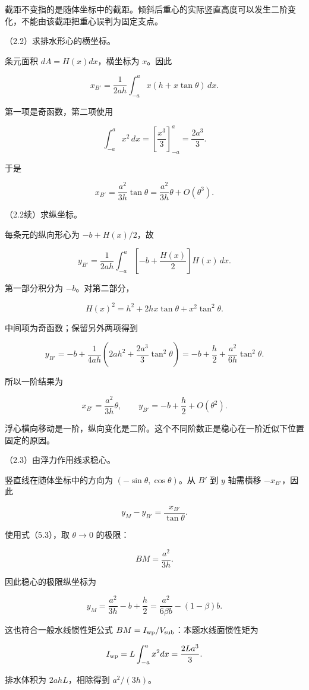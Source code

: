 \documentclass[12pt,a4paper,fontset=fandol]{ctexart}
\begin{document}
截距不变指的是随体坐标中的截距。倾斜后重心的实际竖直高度可以发生二阶变化，不能由该截距把重心误判为固定支点。

（2.2）求排水形心的横坐标。

条元面积 \(dA=H(x)dx\)，横坐标为 \(x\)。因此

\[
x_{B'}=\frac{1}{2ah}\int_{-a}^a x(h+x\tan\theta)\,dx.
\]

第一项是奇函数，第二项使用

\[
\int_{-a}^a x^2\,dx=\left[\frac{x^3}{3}\right]_{-a}^a=\frac{2a^3}{3}.
\]

于是

\[
x_{B'}=\frac{a^2}{3h}\tan\theta
=\frac{a^2}{3h}\theta+O(\theta^3).
\tag{5.3}
\]

（2.2续）求纵坐标。

每条元的纵向形心为 \(-b+H(x)/2\)，故

\[
y_{B'}=\frac{1}{2ah}\int_{-a}^a
\left[-b+\frac{H(x)}2\right]H(x)\,dx.
\]

第一部分积分为 \(-b\)。对第二部分，

\[
H(x)^2=h^2+2hx\tan\theta+x^2\tan^2\theta.
\]

中间项为奇函数；保留另外两项得到

\[
y_{B'}=-b+\frac{1}{4ah}
\left(2ah^2+\frac{2a^3}{3}\tan^2\theta\right)
=-b+\frac h2+\frac{a^2}{6h}\tan^2\theta.
\tag{5.4}
\]

所以一阶结果为

\[
\boxed{x_{B'}=\frac{a^2}{3h}\theta,\qquad
y_{B'}=-b+\frac h2+O(\theta^2).}
\]

浮心横向移动是一阶，纵向变化是二阶。这个不同阶数正是稳心在一阶近似下位置固定的原因。

（2.3）由浮力作用线求稳心。

竖直线在随体坐标中的方向为 \((-\sin\theta,\cos\theta)\)。从 \(B'\) 到
\(y\) 轴需横移 \(-x_{B'}\)，因此

\[
y_M-y_{B'}=\frac{x_{B'}}{\tan\theta}.
\]

使用式（5.3），取 \(\theta\to0\) 的极限：

\[
\boxed{BM=\frac{a^2}{3h}.}
\]

因此稳心的极限纵坐标为

\[
\boxed{y_M=\frac{a^2}{3h}-b+\frac h2
=\frac{a^2}{6\beta b}-(1-\beta)b.}
\tag{5.5}
\]

这也符合一般水线惯性矩公式
\(BM=I_{\rm wp}/V_{\rm sub}\)：本题水线面惯性矩为

\[
I_{\rm wp}=L\int_{-a}^a x^2dx=\frac{2La^3}{3}.
\]

排水体积为 \(2ahL\)，相除得到 \(a^2/(3h)\)。
\end{document}
